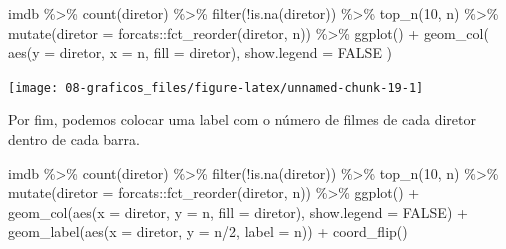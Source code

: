 \documentclass[
]{book}
\newenvironment{Shaded}{\begin{snugshade}}{\end{snugshade}}
\newcommand{\AttributeTok}[1]{\textcolor[rgb]{0.77,0.63,0.00}{#1}}
\newcommand{\ConstantTok}[1]{\textcolor[rgb]{0.00,0.00,0.00}{#1}}
\newcommand{\DecValTok}[1]{\textcolor[rgb]{0.00,0.00,0.81}{#1}}
\newcommand{\FunctionTok}[1]{\textcolor[rgb]{0.00,0.00,0.00}{#1}}
\newcommand{\NormalTok}[1]{#1}
\newcommand{\SpecialCharTok}[1]{\textcolor[rgb]{0.00,0.00,0.00}{#1}}
\begin{document}
\begin{Shaded}
\begin{Highlighting}[]
\NormalTok{imdb }\SpecialCharTok{\%\textgreater{}\%} 
  \FunctionTok{count}\NormalTok{(diretor) }\SpecialCharTok{\%\textgreater{}\%}
  \FunctionTok{filter}\NormalTok{(}\SpecialCharTok{!}\FunctionTok{is.na}\NormalTok{(diretor)) }\SpecialCharTok{\%\textgreater{}\%} 
  \FunctionTok{top\_n}\NormalTok{(}\DecValTok{10}\NormalTok{, n) }\SpecialCharTok{\%\textgreater{}\%}
  \FunctionTok{mutate}\NormalTok{(}\AttributeTok{diretor =}\NormalTok{ forcats}\SpecialCharTok{::}\FunctionTok{fct\_reorder}\NormalTok{(diretor, n)) }\SpecialCharTok{\%\textgreater{}\%} 
  \FunctionTok{ggplot}\NormalTok{() }\SpecialCharTok{+}
  \FunctionTok{geom\_col}\NormalTok{(}
    \FunctionTok{aes}\NormalTok{(}\AttributeTok{y =}\NormalTok{ diretor, }\AttributeTok{x =}\NormalTok{ n, }\AttributeTok{fill =}\NormalTok{ diretor),}
    \AttributeTok{show.legend =} \ConstantTok{FALSE}
\NormalTok{  ) }
\end{Highlighting}
\end{Shaded}

\begin{center}\texttt{[image: 08-graficos\_files/figure-latex/unnamed-chunk-19-1]} \end{center}

Por fim, podemos colocar uma label com o número de filmes de cada diretor dentro de cada barra.

\begin{Shaded}
\begin{Highlighting}[]
\NormalTok{imdb }\SpecialCharTok{\%\textgreater{}\%} 
  \FunctionTok{count}\NormalTok{(diretor) }\SpecialCharTok{\%\textgreater{}\%}
  \FunctionTok{filter}\NormalTok{(}\SpecialCharTok{!}\FunctionTok{is.na}\NormalTok{(diretor)) }\SpecialCharTok{\%\textgreater{}\%} 
  \FunctionTok{top\_n}\NormalTok{(}\DecValTok{10}\NormalTok{, n) }\SpecialCharTok{\%\textgreater{}\%}
  \FunctionTok{mutate}\NormalTok{(}\AttributeTok{diretor =}\NormalTok{ forcats}\SpecialCharTok{::}\FunctionTok{fct\_reorder}\NormalTok{(diretor, n)) }\SpecialCharTok{\%\textgreater{}\%} 
  \FunctionTok{ggplot}\NormalTok{() }\SpecialCharTok{+}
  \FunctionTok{geom\_col}\NormalTok{(}\FunctionTok{aes}\NormalTok{(}\AttributeTok{x =}\NormalTok{ diretor, }\AttributeTok{y =}\NormalTok{ n, }\AttributeTok{fill =}\NormalTok{ diretor), }\AttributeTok{show.legend =} \ConstantTok{FALSE}\NormalTok{) }\SpecialCharTok{+}
  \FunctionTok{geom\_label}\NormalTok{(}\FunctionTok{aes}\NormalTok{(}\AttributeTok{x =}\NormalTok{ diretor, }\AttributeTok{y =}\NormalTok{ n}\SpecialCharTok{/}\DecValTok{2}\NormalTok{, }\AttributeTok{label =}\NormalTok{ n)) }\SpecialCharTok{+}
  \FunctionTok{coord\_flip}\NormalTok{()}
\end{Highlighting}
\end{Shaded}
\end{document}
